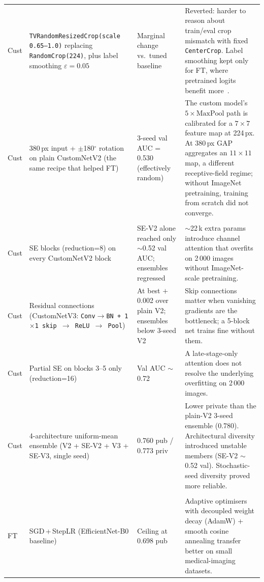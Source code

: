 \documentclass[a4paper, 10pt, twocolumn]{article}
\begin{document}
\begin{tabularx}{\textwidth}{@{}p{0.5cm} p{4.0cm} p{3.4cm} X@{}}
Cust & \texttt{TVRandomResizedCrop(scale 0.65--1.0)} replacing
       \texttt{RandomCrop(224)}, plus label smoothing $\varepsilon{=}0.05$
     & Marginal change vs.\ tuned baseline
     & Reverted: harder to reason about train/eval crop mismatch with
       fixed \texttt{CenterCrop}. Label smoothing kept only for FT,
       where pretrained logits benefit more~\cite{muller2019label}. \\

Cust & 380\,px input + $\pm$180$^\circ$ rotation on plain CustomNetV2
       (the same recipe that helped FT)
     & 3-seed val AUC = 0.530 (effectively random)
     & The custom model's $5{\times}\text{MaxPool}$ path is calibrated for
       a $7{\times}7$ feature map at 224\,px. At 380\,px GAP aggregates an
       $11{\times}11$ map, a different receptive-field regime; without
       ImageNet pretraining, training from scratch did not converge. \\

\addlinespace[2pt]
\multicolumn{4}{@{}l}{\textit{\color{accent}Custom architecture}} \\
Cust & SE blocks (reduction=8) on every CustomNetV2 block
     & SE-V2 alone reached only $\sim$0.52 val AUC; ensembles regressed
     & $\sim$22\,k extra params introduce channel attention that overfits
       on 2\,000 images without ImageNet-scale pretraining. \\

Cust & Residual connections (CustomNetV3:
       \texttt{Conv$\to$BN + 1$\times$1 skip $\to$ ReLU $\to$ Pool})
     & At best $+$0.002 over plain V2; ensembles below 3-seed V2
     & Skip connections matter when vanishing gradients are the bottleneck;
       a 5-block net trains fine without them. \\

Cust & Partial SE on blocks 3--5 only (reduction=16)
     & Val AUC $\sim$0.72
     & A late-stage-only attention does not resolve the underlying
       overfitting on 2\,000 images. \\

Cust & 4-architecture uniform-mean ensemble (V2 + SE-V2 + V3 + SE-V3, single seed)
     & 0.760 pub / 0.773 priv
     & Lower private than the plain-V2 3-seed ensemble (0.780). Architectural
       diversity introduced unstable members (SE-V2 $\sim$0.52 val).
       Stochastic-seed diversity proved more reliable. \\

\addlinespace[2pt]
\multicolumn{4}{@{}l}{\textit{\color{accent}Fine-tuning architecture \& training}} \\
FT   & SGD\,+\,StepLR (EfficientNet-B0 baseline)
     & Ceiling at 0.698 pub
     & Adaptive optimisers with decoupled weight decay (AdamW) + smooth
       cosine annealing transfer better on small medical-imaging datasets. \\


\end{tabularx}
\end{document}
